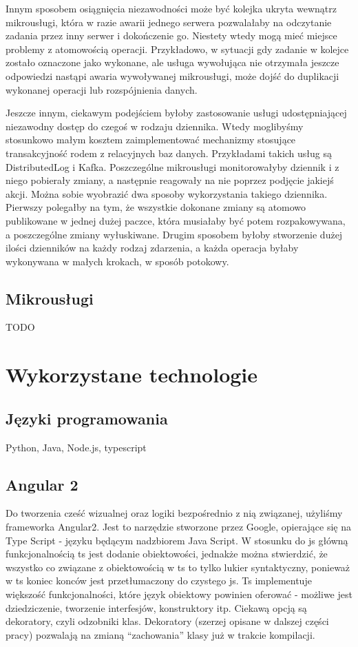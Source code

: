 \documentclass[licencjacka]{pracamgr}
\begin{document}
Innym sposobem osiągnięcia niezawodności może być kolejka ukryta wewnątrz mikrousługi, która w razie awarii jednego serwera pozwalałaby na odczytanie zadania przez inny serwer i dokończenie go. Niestety wtedy mogą mieć miejsce problemy z atomowością operacji. Przykładowo, w sytuacji gdy zadanie w kolejce zostało oznaczone jako wykonane, ale usługa wywołująca nie otrzymała jeszcze odpowiedzi nastąpi awaria wywoływanej mikrousługi, może dojść do duplikacji wykonanej operacji lub rozspójnienia danych.

Jeszcze innym, ciekawym podejściem byłoby zastosowanie usługi udostępniającej niezawodny dostęp do czegoś w rodzaju dziennika. Wtedy moglibyśmy stosunkowo małym kosztem zaimplementować mechanizmy stosujące transakcyjność rodem z relacyjnych baz danych. Przykładami takich usług są DistributedLog i Kafka. Poszczególne mikrousługi monitorowałyby dziennik i z niego pobierały zmiany, a następnie reagowały na nie poprzez podjęcie jakiejś akcji. Można sobie wyobrazić dwa sposoby wykorzystania takiego dziennika. Pierwszy polegałby na tym, że wszystkie dokonane zmiany są atomowo publikowane w jednej dużej paczce, która musiałaby być potem rozpakowywana, a poszczególne zmiany wyłuskiwane. Drugim sposobem byłoby stworzenie dużej ilości dzienników na każdy rodzaj zdarzenia, a każda operacja byłaby wykonywana w małych krokach, w sposób potokowy.

\section{Mikrousługi}
TODO


\chapter{Wykorzystane technologie}

\section{Języki programowania}
Python, Java, Node.js, typescript

\section{Angular 2}

Do tworzenia cześć wizualnej oraz logiki bezpośrednio z nią związanej, użyliśmy frameworka Angular2. Jest to narzędzie stworzone przez Google, opierające się
na Type Script - języku będącym nadzbiorem Java Script. W stosunku do js główną funkcjonalnością ts jest dodanie obiektowości, jednakże można stwierdzić,
że wszystko co związane z obiektowością w ts to tylko lukier syntaktyczny, ponieważ w ts koniec konców jest przetłumaczony do czystego js. Ts implementuje większość
funkcjonalności, które język obiektowy powinien oferować - możliwe jest dziedziczenie, tworzenie interfesjów, konstruktory itp. Ciekawą opcją są dekoratory, czyli
odzobniki klas. Dekoratory (szerzej opisane w dalszej części pracy) pozwalają na zmianą ``zachowania'' klasy już w trakcie kompilacji.
\end{document}
